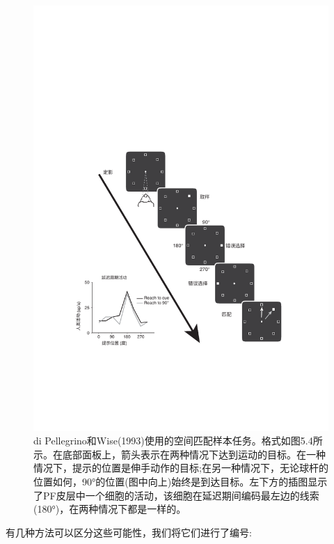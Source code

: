\begin{figure}
	\centering
	\includegraphics[width=0.7\linewidth]{image_pfc/Fig_5_5}
	\caption{di Pellegrino和Wise(1993)使用的空间匹配样本任务。格式如图5.4所示。在底部面板上，箭头表示在两种情况下达到运动的目标。在一种情况下，提示的位置是伸手动作的目标;在另一种情况下，无论球杆的位置如何，90°的位置(图中向上)始终是到达目标。左下方的插图显示了PF皮层中一个细胞的活动，该细胞在延迟期间编码最左边的线索(180°)，在两种情况下都是一样的。}
	\label{fig:fig}
\end{figure}
有几种方法可以区分这些可能性，我们将它们进行了编号:

